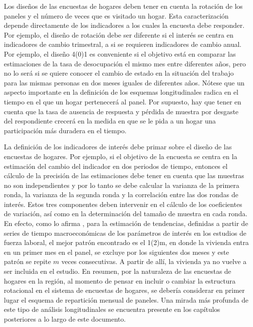 \documentclass[
  12pt,
]{book}
\begin{document}
Los diseños de las encuestas de hogares deben tener en cuenta la rotación de los paneles y el número de veces que es visitado un hogar. Esta caracterización depende directamente de los indicadores a los cuales la encuesta debe responder. Por ejemplo, el diseño de rotación debe ser diferente si el interés se centra en indicadores de cambio trimestral, a si se requieren indicadores de cambio anual. Por ejemplo, el diseño 4(0)1 es conveniente si el objetivo está en comparar las estimaciones de la tasa de desocupación el mismo mes entre diferentes años, pero no lo será si se quiere conocer el cambio de estado en la situación del trabajo para las mismas personas en dos meses iguales de diferentes años. Nótese que un aspecto importante en la definición de los esquemas longitudinales radica en el tiempo en el que un hogar pertenecerá al panel. Por supuesto, hay que tener en cuenta que la tasa de ausencia de respuesta y pérdida de muestra por desgaste del respondiente crecerá en la medida en que se le pida a un hogar una participación más duradera en el tiempo.

La definición de los indicadores de interés debe primar sobre el diseño de las encuestas de hogares. Por ejemplo, si el objetivo de la encuesta se centra en la estimación del cambio del indicador en dos periodos de tiempo, entonces el cálculo de la precisión de las estimaciones debe tener en cuenta que las muestras no son independientes y por lo tanto se debe calcular la varianza de la primera ronda, la varianza de la segunda ronda y la correlación entre las dos rondas de interés. Estos tres componentes deben intervenir en el cálculo de los coeficientes de variación, así como en la determinación del tamaño de muestra en cada ronda. En efecto, como lo afirma \citet[pág. 236]{McLaren_Steel_2001}, para la estimación de tendencias, definidas a partir de series de tiempo macroeconómicas de los parámetros de interés en los estudios de fuerza laboral, el mejor patrón encontrado es el 1(2)m, en donde la vivienda entra en un primer mes en el panel, se excluye por los siguientes dos meses y este patrón se repite \(m\) veces consecutivas. A partir de allí, la vivienda ya no vuelve a ser incluida en el estudio. En resumen, por la naturaleza de las encuestas de hogares en la región, al momento de pensar en incluir o cambiar la estructura rotacional en el sistema de encuestas de hogares, se debería considerar en primer lugar el esquema de repartición mensual de paneles. Una mirada más profunda de este tipo de análisis longitudinales se encuentra presente en los capítulos posteriores a lo largo de este documento.
\end{document}
